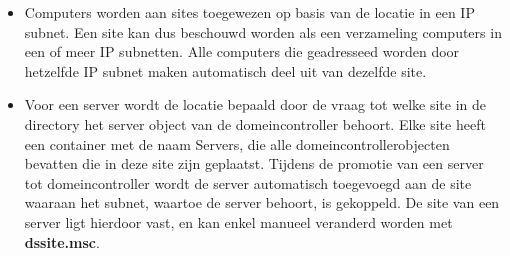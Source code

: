 \documentclass{report}
\begin{document}
\begin{enumerate}
		 { 
			\begin{itemize}
				\item Computers worden aan sites toegewezen op basis van de locatie in een IP subnet. Een site kan dus beschouwd worden als een verzameling computers in een of meer IP subnetten. Alle computers die geadresseed worden door hetzelfde IP subnet maken automatisch deel uit van dezelfde site.
				\item Voor een server wordt de locatie bepaald door de vraag tot welke site in de directory het server object van de domeincontroller behoort. Elke site heeft een container met de naam Servers, die alle domeincontrollerobjecten bevatten die in deze site zijn geplaatst. Tijdens de promotie van een server tot domeincontroller wordt de server automatisch toegevoegd aan de site waaraan het subnet, waartoe de server behoort, is gekoppeld. De site van een server ligt hierdoor vast, en kan enkel manueel veranderd worden met \textbf{dssite.msc}.
			\end{itemize}
		}
	\end{enumerate}
	
\end{document}
